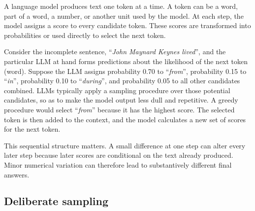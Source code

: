 \documentclass[11pt]{article}
\begin{document}
A language model produces text one token at a time. A token can be a word, part of a word, a number, or another unit used by the model. At each step, the model assigns a score to every candidate token. These scores are transformed into probabilities or used directly to select the next token.\medskip

Consider the incomplete sentence, ``\textit{John Maynard Keynes lived}'', and the particular LLM at hand forms predictions about the likelihood of the next token (word). Suppose the LLM assigns probability 0.70 to ``\textit{from}'', probability 0.15 to ``\textit{in}'', probability 0.10 to ``\textit{during}'', and probability 0.05 to all other candidates combined. LLMs typically apply a sampling procedure over those potential candidates, so as to make the model output less dull and repetitive. A greedy procedure would select ``\textit{from}'' because it has the highest score. The selected token is then added to the context, and the model calculates a new set of scores for the next token.\medskip

This sequential structure matters. A small difference at one step can alter every later step because later scores are conditional on the text already produced. Minor numerical variation can therefore lead to substantively different final answers.

\subsection{Deliberate sampling}
\end{document}
